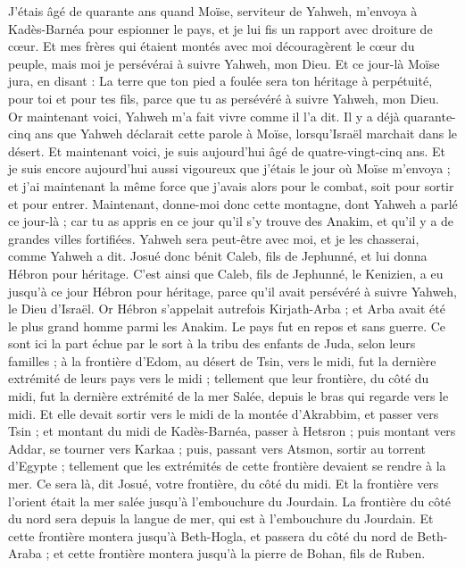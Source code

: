 \begin{multicols}{2}
J'étais âgé de quarante ans quand Moïse, serviteur de Yahweh, m'envoya à Kadès-Barnéa pour espionner le pays, et je lui fis un rapport avec droiture de cœur.
Et mes frères qui étaient montés avec moi découragèrent le cœur du peuple, mais moi je persévérai à suivre Yahweh, mon Dieu.
Et ce jour-là Moïse jura, en disant : La terre que ton pied a foulée sera ton héritage à perpétuité, pour toi et pour tes fils, parce que tu as persévéré à suivre Yahweh, mon Dieu.
Or maintenant voici, Yahweh m'a fait vivre comme il l'a dit. Il y a déjà quarante-cinq ans que Yahweh déclarait cette parole à Moïse, lorsqu'Israël marchait dans le désert. Et maintenant voici, je suis aujourd'hui âgé de quatre-vingt-cinq ans.
Et je suis encore aujourd'hui aussi vigoureux que j'étais le jour où Moïse m'envoya ; et j'ai maintenant la même force que j'avais alors pour le combat, soit pour sortir et pour entrer.
Maintenant, donne-moi donc cette montagne, dont Yahweh a parlé ce jour-là ; car tu as appris en ce jour qu'il s'y trouve des Anakim, et qu'il y a de grandes villes fortifiées. Yahweh sera peut-être avec moi, et je les chasserai, comme Yahweh a dit.
Josué donc bénit Caleb, fils de Jephunné, et lui donna Hébron pour héritage.
C'est ainsi que Caleb, fils de Jephunné, le Kenizien, a eu jusqu'à ce jour Hébron pour héritage, parce qu'il avait persévéré à suivre Yahweh, le Dieu d'Israël.
Or Hébron s'appelait autrefois Kirjath-Arba ; et Arba avait été le plus grand homme parmi les Anakim. Le pays fut en repos et sans guerre.
\VerseOne{} Ce sont ici la part échue par le sort à la tribu des enfants de Juda, selon leurs familles ; à la frontière d'Edom, au désert de Tsin, vers le midi, fut la dernière extrémité de leurs pays vers le midi ;
tellement que leur frontière, du côté du midi, fut la dernière extrémité de la mer Salée, depuis le bras qui regarde vers le midi. 
Et elle devait sortir vers le midi de la montée d'Akrabbim, et passer vers Tsin ; et montant du midi de Kadès-Barnéa, passer à Hetsron ; puis montant vers Addar, se tourner vers Karkaa ; 
puis, passant vers Atsmon, sortir au torrent d'Egypte ; tellement que les extrémités de cette frontière devaient se rendre à la mer. Ce sera là, dit Josué, votre frontière, du côté du midi.
Et la frontière vers l'orient était la mer salée jusqu'à l'embouchure du Jourdain. La frontière du côté du nord sera depuis la langue de mer, qui est à l'embouchure du Jourdain.
Et cette frontière montera jusqu'à Beth-Hogla, et passera du côté du nord de Beth-Araba ; et cette frontière montera jusqu'à la pierre de Bohan, fils de Ruben.

\end{multicols}
